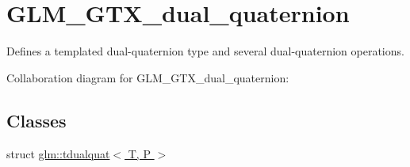\hypertarget{group__gtx__dual__quaternion}{\section{G\-L\-M\-\_\-\-G\-T\-X\-\_\-dual\-\_\-quaternion}
\label{group__gtx__dual__quaternion}
}


Defines a templated dual-\/quaternion type and several dual-\/quaternion operations.  


Collaboration diagram for G\-L\-M\-\_\-\-G\-T\-X\-\_\-dual\-\_\-quaternion\-:
\subsection*{Classes}
\begin{DoxyCompactItemize}
\item 
struct \hyperlink{structglm_1_1tdualquat}{glm\-::tdualquat$<$ T, P $>$}
\end{DoxyCompactItemize}
